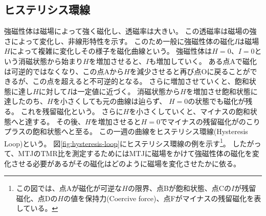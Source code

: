 \documentclass[../../../main]{subfiles}
\begin{document}


\subsection{ヒステリシス環線}
強磁性体は磁場によって強く磁化し、透磁率は大きい。
この透磁率は磁場の強さによって変化し、非線形特性を示す。
このため一般に強磁性体の磁化$I$は磁場$H$によって複雑に変化しその様子を磁化曲線という。
強磁性体は$H=0$、$I=0$という消磁状態から始まり$H$を増加させると、$I$も増加していく。
ある点Aで磁化は可逆的ではなくなり、この点Aから$H$を減少させると再び点Oに戻ることができるが、この点を超えると不可逆的となる。
さらに増加させていくと、飽和状態に達し$H$に対して$I$は一定値に近づく。
消磁状態から$H$を増加させ飽和状態に達したのち、$H$を小さくしても元の曲線は辿らず、
$H=0$の状態でも磁化が残る。
これを残留磁化という。
さらに$H$を小さくしていくと、マイナスの飽和状態へと達する。
その後、$H$を増加させると$H=0$でマイナスの残留磁化がのこりプラスの飽和状態へと至る。
この一週の曲線をヒステリシス環線(Hysteresis Loop)という。\cite{ferromagnetic}
図\ref{fig:hysteresis-loop}にヒステリシス環線の例を示す\footnote{
    この図では、点Aが磁化が可逆な$H$の限界、点Bが飽和状態、点Cの$I$が残留磁化、点Dの$H$の値を保持力(Coercive force)、点Fがマイナスの残留磁化を表している。
}。
したがって、MTJのTMR比を測定するためにはMTJに磁場をかけて強磁性体の磁化を変化させる必要があるがその磁化はどのように磁場を変化させたかに依る。

\end{document}
